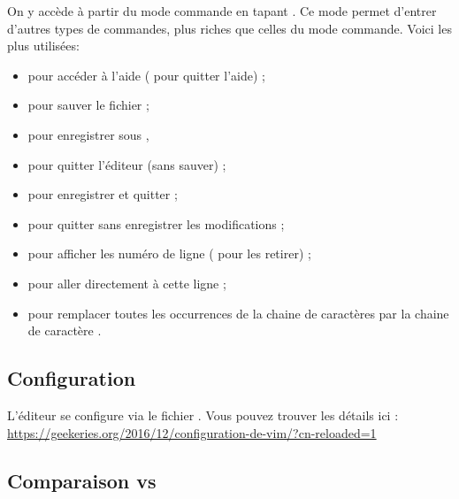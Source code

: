 \documentclass[a4paper,11pt]{style-esi/td}
\begin{document}
On y accède à partir du mode commande en tapant \kbd{:}.
Ce mode permet d'entrer d'autres types de commandes,
plus riches que celles du mode commande.
Voici les plus utilisées:
\begin{itemize}
	\item {} pour accéder à l'aide ( pour quitter l'aide) ;
	\item {} pour sauver le fichier ;
	\item {} pour enregistrer sous ,
	\item {} pour quitter l'éditeur (sans sauver) ;
	\item {} pour enregistrer et quitter ;
	\item {} pour quitter sans enregistrer les modifications ;
	\item {} pour afficher les numéro de ligne
	      ( pour les retirer) ;
	\item {} pour aller directement à cette ligne ;
	\item {}
	      pour remplacer toutes les occurrences de la chaine de caractères
	       par la chaine de caractère .
\end{itemize}

\subsection*{Configuration}

L'éditeur  se configure via le fichier .
Vous pouvez trouver les détails ici :
\url{https://geekeries.org/2016/12/configuration-de-vim/?cn-reloaded=1}

\subsection*{Comparaison  vs }
\end{document}
